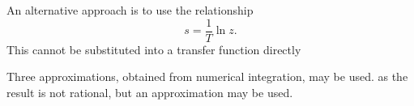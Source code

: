 An alternative approach is to use the relationship \[ s  = \frac{1}{T}
\ln z. \] This cannot be substituted into a transfer function directly

Three approximations, obtained from numerical integration, may be
used.
as the result is not rational, but an approximation may be used.
\endinput
